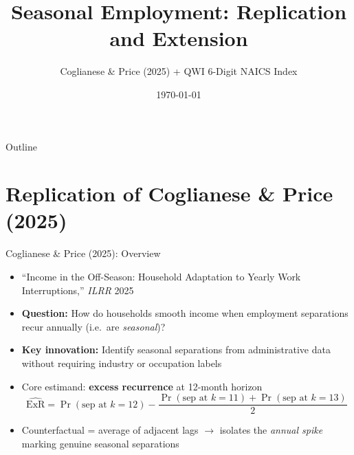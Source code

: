 \documentclass[aspectratio=169]{beamer}
\title{Seasonal Employment: Replication and Extension}
\subtitle{Coglianese \& Price (2025) + QWI 6-Digit NAICS Index}
\date{\today}
\begin{document}
\begin{frame}
  \titlepage
\end{frame}

\begin{frame}{Outline}
  \tableofcontents
\end{frame}

\section{Replication of Coglianese \& Price (2025)}

\begin{frame}{Coglianese \& Price (2025): Overview}
  \begin{itemize}
    \item ``Income in the Off-Season: Household Adaptation to Yearly Work
          Interruptions,'' \textit{ILRR} 2025
    \item \textbf{Question:} How do households smooth income when employment
          separations recur annually (i.e.\ are \emph{seasonal})?
    \item \textbf{Key innovation:} Identify seasonal separations from
          administrative data without requiring industry or occupation labels
    \bigskip
    \item Core estimand: \textbf{excess recurrence} at 12-month horizon
    \[
      \widehat{\text{ExR}}
      = \Pr(\text{sep at }k{=}12)
        - \frac{\Pr(\text{sep at }k{=}11) + \Pr(\text{sep at }k{=}13)}{2}
    \]
    \item Counterfactual = average of adjacent lags $\to$ isolates the
          \emph{annual spike} marking genuine seasonal separations
  \end{itemize}
\end{frame}
\end{document}
